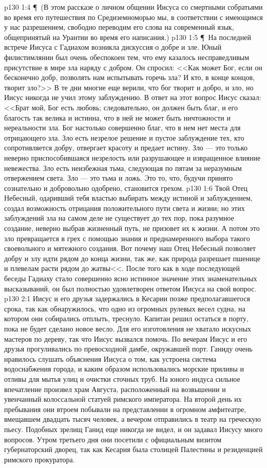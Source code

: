 \vs p130 1:4 \P\ (В этом рассказе о личном общении Иисуса со смертными собратьями во время его путешествия по Средиземноморью мы, в соответствии с имеющимся у нас разрешением, свободно переводим его слова на современный язык, общепринятый на Урантии во время его написания.)
\vs p130 1:5 \P\ На последней встрече Иисуса с Гадиахом возникла дискуссия о добре и зле. Юный филистимлянин был очень обеспокоен тем, что ему казалось несправедливым присутствие в мире зла наряду с добром. Он спросил: <<Как может Бог, если он бесконечно добр, позволять нам испытывать горечь зла? И кто, в конце концов, творит зло?>> В те дни многие еще верили, что бог творит и добро, и зло, но Иисус никогда не учил этому заблуждению. В ответ на этот вопрос Иисус сказал: <<Брат мой, Бог есть любовь; следовательно, он должен быть благ, и его благость так велика и истинна, что в ней не может быть ничтожности и нереальности зла. Бог настолько совершенно благ, что в нем нет места для отрицающего зла. Зло есть незрелое решение и пустое заблуждение тех, кто сопротивляется добру, отвергает красоту и предает истину. Зло --- это только неверно приспособившаяся незрелость или разрушающее и извращенное влияние невежества. Зло есть неизбежная тьма, следующая по пятам за неразумным отвержением света. Зло --- это тьма и ложь. Это то, что, будучи принято сознательно и добровольно одобрено, становится грехом.
\vs p130 1:6 Твой Отец Небесный, одаривший тебя властью выбирать между истиной и заблуждением, создал возможность отрицания положительного пути света и жизни; но этих заблуждений зла на самом деле не существует до тех пор, пока разумное создание, неверно выбрав жизненный путь, не призовет их к жизни. А потом это зло превращается в грех с помощью знания и преднамеренного выбора такого своевольного и мятежного создания. Вот почему наш Отец Небесный позволяет добру и злу идти рядом до конца жизни, так же, как природа разрешает пшенице и плевелам расти рядом до жатвы<<. После того как в ходе последующей беседы Гадиаху стало совершенно ясно истинное значение этих знаменательных высказываний, он был полностью удовлетворен ответом Иисуса на свой вопрос.
\vs p130 2:1 Иисус и его друзья задержались в Кесарии позже предполагавшегося срока, так как обнаружилось, что одно из огромных рулевых весел судна, на котором они собирались отплыть, треснуло. Капитан решил остаться в порту, пока не будет сделано новое весло. Для его изготовления не хватало искусных мастеров по дереву, так что Иисус вызвался помочь. По вечерам Иисус и его друзья прогуливались по превосходной дамбе, окружавшей порт. Ганиду очень нравилось слушать объяснения Иисуса о том, как устроена система водоснабжения города, и каким образом использовались морские приливы и отливы для мытья улиц и очистки сточных труб. На юного индуса сильное впечатление произвел храм Августа, расположенный на возвышении и увенчанный колоссальной статуей римского императора. На второй день их пребывания они втроем побывали на представлении в огромном амфитеатре, вмещавшем двадцать тысяч человек, а вечером отправились в театр на греческую пьесу. Подобных зрелищ Ганид еще никогда не видел, и он задавал Иисусу много вопросов. Утром третьего дня они посетили с официальным визитом губернаторский дворец, так как Кесария была столицей Палестины и резиденцией римского прокуратора.
